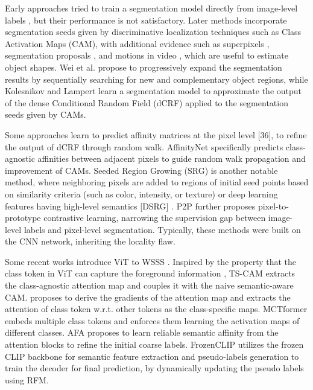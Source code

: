  Early approaches tried to train a segmentation model directly from image-level labels \cite{dcnn}, but their performance is not satisfactory. Later methods incorporate segmentation seeds given by discriminative localization techniques such as Class Activation Maps (CAM)\cite{cam}, with additional evidence such as superpixels \cite{imagelevelpixel}, segmentation proposals \cite{imagelevelpixel}, and motions in video \cite{wsss_motion_cues}, which are useful to estimate object shapes. Wei et al.\cite{adversarial_erasing} propose to progressively expand the segmentation results by sequentially searching for new and complementary object regions, while Kolesnikov and Lampert \cite{kolesnikov2016} learn a segmentation model to approximate the output of the dense Conditional Random Field (dCRF) \cite{krähenbühl} applied to the segmentation seeds given by CAMs.

Some approaches learn to predict affinity matrices at the pixel level [36], to refine the output of dCRF through random walk. AffinityNet \cite{wsss_affinitynet} specifically predicts class-agnostic affinities between adjacent pixels to guide random walk propagation and improvement of CAMs. Seeded Region Growing (SRG) \cite{srg} is another notable method, where neighboring pixels are added to regions of initial seed points based on similarity criteria (such as color, intensity, or texture) or deep learning features having high-level semantics [DSRG] \cite{wsss_dsrg_deep_seeded_region_growing}.  P2P \cite{pixel_to_prototype} further proposes pixel-to-prototype contrastive learning, narrowing the supervision gap between image-level labels and pixel-level segmentation. Typically, these methods were built on the CNN network, inheriting the locality flaw. 

Some recent works introduce ViT to WSSS \cite{camtokens, getam}. Inspired by the property that the class token in ViT can capture the foreground information \cite{caron}, TS-CAM\cite{camtokens} extracts the class-agnostic attention map and couples it with the naive semantic-aware CAM. \cite{getam} proposes to derive the gradients of the attention map and extracts the attention of class token w.r.t. other tokens as the class-specific maps. MCTformer \cite{MCTformer} embeds multiple class tokens and enforces them learning the activation maps of different classes. AFA \cite{wsss_afa_affinity_from_attention} proposes to learn reliable semantic affinity from the attention blocks to refine the initial coarse labels. FrozenCLIP \cite{wsss_frozen_clip} utilizes the frozen CLIP backbone for semantic feature extraction and pseudo-labels generation to train the decoder for final prediction, by dynamically updating the pseudo labels using RFM.



